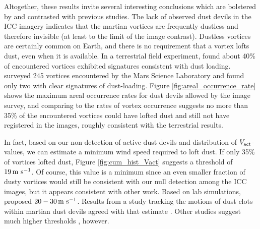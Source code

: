\documentclass{aastex63}
\begin{document}
Altogether, these results invite several interesting conclusions which are bolstered by and contrasted with previous studies. The lack of observed dust devils in the ICC imagery indicates that the martian vortices are frequently dustless and therefore invisible (at least to the limit of the image contrast). Dustless vortices are certainly common on Earth, and there is no requirement that a vortex lofts dust, even when it is available. In a terrestrial field experiment, \citet{LORENZ20151} found about 40\% of encountered vortices exhibited signatures consistent with dust loading. \citet{2016Icar..278..180S} surveyed 245 vortices encountered by the Mars Science Laboratory and found only two with clear signatures of dust-loading. Figure \ref{fig:areal_occurrence_rate} shows the maximum areal occurrence rates for dust devils allowed by the image survey, and comparing to the rates of vortex occurrence suggests no more than 35\% of the encountered vortices could have lofted dust and still not have registered in the images, roughly consistent with the terrestrial results. 



In fact, based on our non-detection of active dust devils and distribution of $V_{\rm act}$-values, we can estimate a minimum wind speed required to loft dust. If only 35\% of vortices lofted dust, Figure \ref{fig:cum_hist_Vact} suggests a threshold of $19\,{\rm m\ s^{-1}}$. Of course, this value is a minimum since an even smaller fraction of dusty vortices would still be consistent with our null detection among the ICC images, but it appears consistent with other work. Based on lab simulations, \citet{2003JGRE..108.5041G} proposed $20-30\,{\rm m\ s^{-1}}$. Results from a study tracking the motions of dust clots within martian dust devils agreed with that estimate \citep{2011GeoRL..3824206C}. Other studies suggest much higher thresholds \citep[cf.][]{2006JGRE..11112002C}, however. 
\end{document}
